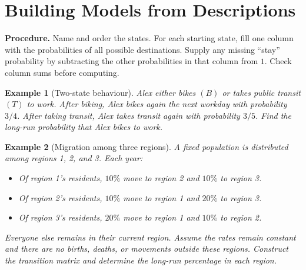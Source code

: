 \documentclass{article}
\theoremstyle{plain}
\newtheorem{example}{Example}[section]
\theoremstyle{definition}
\theoremstyle{remark}
\newcommand{\work}{\par\vfill}
\begin{document}
\work

\newpage
\section{Building Models from Descriptions}
\textbf{Procedure.} Name and order the states. For each starting state, fill one column with the probabilities of all possible destinations. Supply any missing ``stay'' probability by subtracting the other probabilities in that column from $1$. Check column sums before computing.
\begin{example}[Two-state behaviour]\label{ex:commute}
Alex either bikes $(B)$ or takes public transit $(T)$ to work. After biking, Alex bikes again the next workday with probability $3/4$. After taking transit, Alex takes transit again with probability $3/5$. Find the long-run probability that Alex bikes to work.
\end{example}

\work

\newpage
\begin{example}[Migration among three regions]\label{ex:migration}
A fixed population is distributed among regions 1, 2, and 3. Each year:
\begin{itemize}
\item Of region 1's residents, $10\%$ move to region 2 and $10\%$ to region 3.
\item Of region 2's residents, $10\%$ move to region 1 and $20\%$ to region 3.
\item Of region 3's residents, $20\%$ move to region 1 and $10\%$ to region 2.
\end{itemize}
Everyone else remains in their current region. Assume the rates remain constant and there are no births, deaths, or movements outside these regions. Construct the transition matrix and determine the long-run percentage in each region.
\end{example}

\work

\newpage
\end{document}
